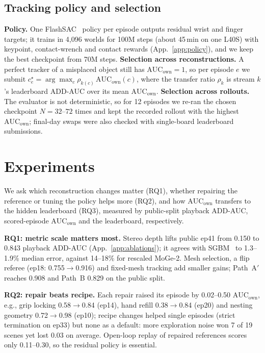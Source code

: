 \documentclass[10pt]{nvidiaextabstract}
\newcommand{\ownauc}{\ensuremath{\mathrm{AUC}_{\text{own}}}\xspace}
\begin{document}
\subsection{Tracking policy and selection}
\label{sec:policy}
\textbf{Policy.} One FlashSAC~\cite{flashchord,haarnoja2018sac} policy per episode outputs residual wrist and finger targets; it trains in 4,096 worlds for 100M steps (about 45\,min on one L40S) with keypoint, contact-wrench and contact rewards (App.~\ref{app:policy}), and we keep the best checkpoint from 70M steps.
\textbf{Selection across reconstructions.} A perfect tracker of a misplaced object still has $\ownauc\!=\!1$, so per episode $e$ we submit $c^\star_e=\arg\max_{c}\rho_{k(c)}\,\ownauc(c)$, where the transfer ratio $\rho_k$ is stream $k$'s leaderboard ADD-AUC over its mean \ownauc.
\textbf{Selection across rollouts.} The evaluator is not deterministic, so for 12 episodes we re-ran the chosen checkpoint $N\!=\!32$--$72$ times and kept the recorded rollout with the highest \ownauc; final-day swaps were also checked with single-board leaderboard submissions.

\section{Experiments}
\label{sec:experiments}

We ask which reconstruction changes matter (RQ1), whether repairing the reference or tuning the policy helps more (RQ2), and how \ownauc transfers to the hidden leaderboard (RQ3), measured by public-split playback ADD-AUC, scored-episode \ownauc and the leaderboard, respectively.

\textbf{RQ1: metric scale matters most.} Stereo depth lifts public ep41 from 0.150 to 0.843 playback ADD-AUC (App.~\ref{app:ablations}); it agrees with SGBM~\cite{hirschmuller2008sgm} to 1.3--1.9\% median error, against 14--18\% for rescaled MoGe-2. Mesh selection, a flip referee (ep18: 0.755$\to$0.916) and fixed-mesh tracking add smaller gains; Path~A$'$ reaches 0.908 and Path~B 0.829 on the public split.

\textbf{RQ2: repair beats recipe.} Each repair raised its episode by 0.02--0.50 \ownauc, e.g., grip locking 0.58$\to$0.84 (ep14), hand refill 0.38$\to$0.84 (ep20) and nesting geometry 0.72$\to$0.98 (ep10); recipe changes helped single episodes (strict termination on ep33) but none as a default: more exploration noise won 7 of 19 scenes yet lost 0.03 on average. Open-loop replay of repaired references scores only 0.11--0.30, so the residual policy is essential.
\end{document}
